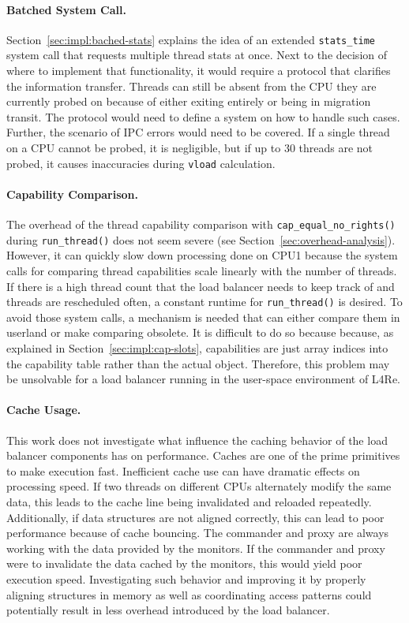 \paragraph{Batched System Call.}

Section~\ref{sec:impl:bached-stats} explains the idea of an extended \texttt{stats\_time} system call that requests multiple thread stats at once.
Next to the decision of where to implement that functionality, it would require a protocol that clarifies the information transfer.
Threads can still be absent from the CPU they are currently probed on because of either exiting entirely or being in migration transit.
The protocol would need to define a system on how to handle such cases.
Further, the scenario of IPC errors would need to be covered.
If a single thread on a CPU cannot be probed, it is negligible, but if up to 30 threads are not probed, it causes inaccuracies during \texttt{vload} calculation.

\paragraph{Capability Comparison.}

The overhead of the thread capability comparison with \texttt{cap\_equal\_no\_rights()} during \texttt{run\_thread()} does not seem severe (see Section~\ref{sec:overhead-analysis}).
However, it can quickly slow down processing done on CPU1 because the system calls for comparing thread capabilities scale linearly with the number of threads.
If there is a high thread count that the load balancer needs to keep track of and threads are rescheduled often, a constant runtime for \texttt{run\_thread()} is desired.
To avoid those system calls, a mechanism is needed that can either compare them in userland or make comparing obsolete.
It is difficult to do so because because, as explained in Section~\ref{sec:impl:cap-slots}, capabilities are just array indices into the capability table rather than the actual object.
Therefore, this problem may be unsolvable for a load balancer running in the user-space environment of L4Re.

\paragraph{Cache Usage.}

This work does not investigate what influence the caching behavior of the load balancer components has on performance.
Caches are one of the prime primitives to make execution fast.
Inefficient cache use can have dramatic effects on processing speed.
If two threads on different CPUs alternately modify the same data, this leads to the cache line being invalidated and reloaded repeatedly.
Additionally, if data structures are not aligned correctly, this can lead to poor performance because of cache bouncing.
The commander and proxy are always working with the data provided by the monitors.
If the commander and proxy were to invalidate the data cached by the monitors, this would yield poor execution speed.
Investigating such behavior and improving it by properly aligning structures in memory as well as coordinating access patterns could potentially result in less overhead introduced by the load balancer.

\cleardoublepage

